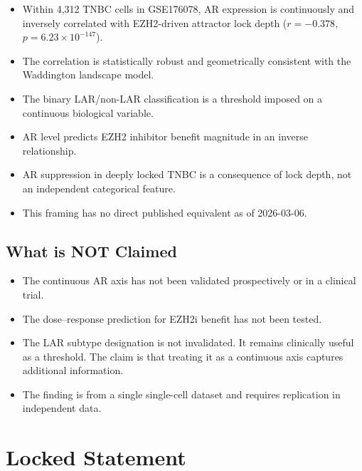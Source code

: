 \documentclass[12pt, a4paper]{article}
\begin{document}
\begin{itemize}
    \item Within 4,312 TNBC cells in GSE176078,
    AR expression is continuously and inversely
    correlated with EZH2-driven attractor lock
    depth ($r = -0.378$,
    $p = 6.23 \times 10^{-147}$).
    \item The correlation is statistically
    robust and geometrically consistent with
    the Waddington landscape model.
    \item The binary LAR/non-LAR classification
    is a threshold imposed on a continuous
    biological variable.
    \item AR level predicts EZH2 inhibitor
    benefit magnitude in an inverse relationship.
    \item AR suppression in deeply locked TNBC
    is a consequence of lock depth, not an
    independent categorical feature.
    \item This framing has no direct published
    equivalent as of 2026-03-06.
\end{itemize}

\subsection{What is NOT Claimed}

\begin{itemize}
    \item The continuous AR axis has not been
    validated prospectively or in a clinical
    trial.
    \item The dose--response prediction for
    EZH2i benefit has not been tested.
    \item The LAR subtype designation is not
    invalidated. It remains clinically useful
    as a threshold. The claim is that treating
    it as a continuous axis captures additional
    information.
    \item The finding is from a single
    single-cell dataset and requires replication
    in independent data.
\end{itemize}

\section{Locked Statement}
\end{document}
